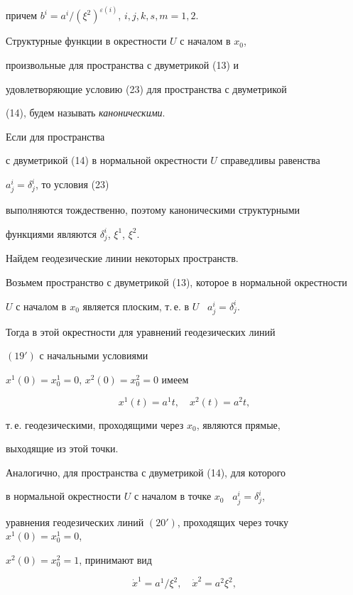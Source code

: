 причем $b^i=a^i/(\xi^2)^{\varepsilon(i)}$, $i,j,k,s,m=1,2$.


Структурные функции в окрестности $U$ с началом в $x_0$,


произвольные для пространства с двуметрикой (13) и


удовлетворяющие условию (23) для пространства с двуметрикой


(14), будем называть {\it каноническими}.


Если для пространства


с двуметрикой (14) в нормальной окрестности $U$ справедливы равенства


$a^i_j=\delta^i_j$, то условия (23)


выполняются тождественно, поэтому каноническими структурными


функциями являются $\delta^i_j$, $\xi^1$, $\xi^2$.





Найдем геодезические линии некоторых пространств.


Возьмем пространство с двуметрикой (13), которое в нормальной окрестности


$U$ с началом в $x_0$ является плоским, т.\,е. в $U$ \ $a^i_j=\delta^i_j$.


Тогда в этой окрестности для уравнений геодезических линий


$(19')$ с начальными условиями


$x^1(0)=x^1_0=0$, $x^2(0)=x^2_0=0$ имеем


$$


x^1(t)=a^1t,\quad x^2(t)=a^2t,


$$


т.\,е. геодезическими, проходящими через $x_0$, являются прямые,


выходящие из этой точки.





Аналогично, для пространства с двуметрикой (14), для которого


в нормальной окрестности $U$ с началом в точке $x_0$ \ $a^i_j=\delta^i_j$,


уравнения геодезических линий $(20')$, проходящих через точку $x^1(0)=x^1_0=0$,


$x^2(0)=x^2_0=1$, принимают вид


$$


\Dot{x}^1=a^1/\xi^2,\quad \Dot{x}^2=a^2\xi^2,


$$


